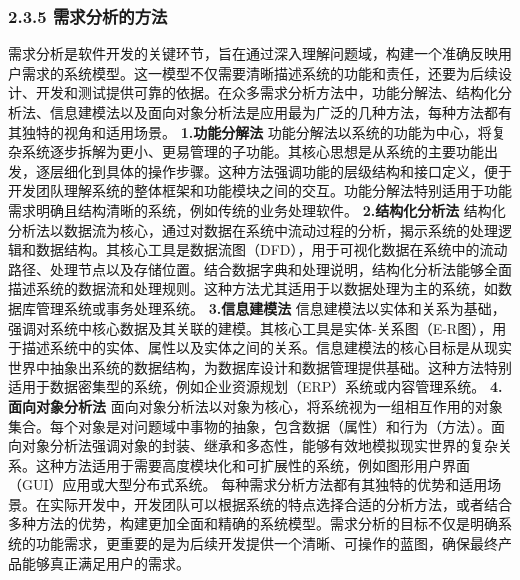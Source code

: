 \subsubsection{2.3.5 需求分析的方法}\label{ux9700ux6c42ux5206ux6790ux7684ux65b9ux6cd5}
需求分析是软件开发的关键环节，旨在通过深入理解问题域，构建一个准确反映用户需求的系统模型。这一模型不仅需要清晰描述系统的功能和责任，还要为后续设计、开发和测试提供可靠的依据。在众多需求分析方法中，功能分解法、结构化分析法、信息建模法以及面向对象分析法是应用最为广泛的几种方法，每种方法都有其独特的视角和适用场景。
\textbf{1.功能分解法}
功能分解法以系统的功能为中心，将复杂系统逐步拆解为更小、更易管理的子功能。其核心思想是从系统的主要功能出发，逐层细化到具体的操作步骤。这种方法强调功能的层级结构和接口定义，便于开发团队理解系统的整体框架和功能模块之间的交互。功能分解法特别适用于功能需求明确且结构清晰的系统，例如传统的业务处理软件。
\textbf{2.结构化分析法}
结构化分析法以数据流为核心，通过对数据在系统中流动过程的分析，揭示系统的处理逻辑和数据结构。其核心工具是数据流图（DFD），用于可视化数据在系统中的流动路径、处理节点以及存储位置。结合数据字典和处理说明，结构化分析法能够全面描述系统的数据流和处理规则。这种方法尤其适用于以数据处理为主的系统，如数据库管理系统或事务处理系统。
\textbf{3.信息建模法}
信息建模法以实体和关系为基础，强调对系统中核心数据及其关联的建模。其核心工具是实体-关系图（E-R图），用于描述系统中的实体、属性以及实体之间的关系。信息建模法的核心目标是从现实世界中抽象出系统的数据结构，为数据库设计和数据管理提供基础。这种方法特别适用于数据密集型的系统，例如企业资源规划（ERP）系统或内容管理系统。
\textbf{4.面向对象分析法}
面向对象分析法以对象为核心，将系统视为一组相互作用的对象集合。每个对象是对问题域中事物的抽象，包含数据（属性）和行为（方法）。面向对象分析法强调对象的封装、继承和多态性，能够有效地模拟现实世界的复杂关系。这种方法适用于需要高度模块化和可扩展性的系统，例如图形用户界面（GUI）应用或大型分布式系统。
每种需求分析方法都有其独特的优势和适用场景。在实际开发中，开发团队可以根据系统的特点选择合适的分析方法，或者结合多种方法的优势，构建更加全面和精确的系统模型。需求分析的目标不仅是明确系统的功能需求，更重要的是为后续开发提供一个清晰、可操作的蓝图，确保最终产品能够真正满足用户的需求。
